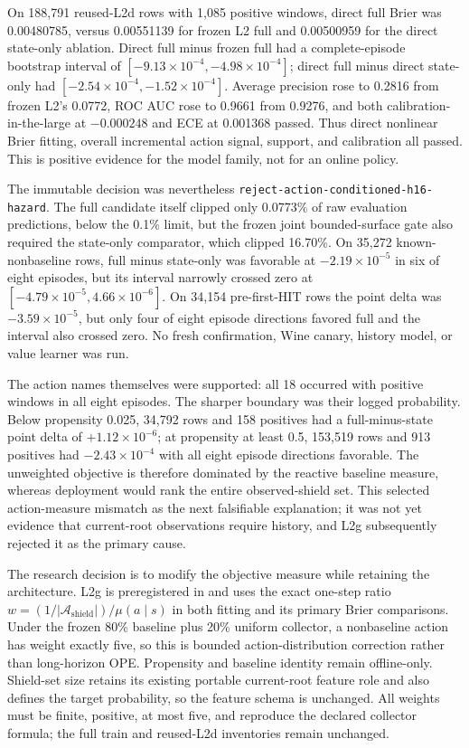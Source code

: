 \documentclass[11pt]{article}
\begin{document}
On 188,791 reused-L2d rows with 1,085 positive windows, direct full Brier was
0.00480785, versus 0.00551139 for frozen L2 full and 0.00500959 for the direct
state-only ablation.  Direct full minus frozen full had a complete-episode
bootstrap interval of
$[-9.13\times10^{-4},-4.98\times10^{-4}]$; direct full minus direct state-only
had $[-2.54\times10^{-4},-1.52\times10^{-4}]$.  Average precision rose to
0.2816 from frozen L2's 0.0772, ROC AUC rose to 0.9661 from 0.9276, and both
calibration-in-the-large at $-0.000248$ and ECE at 0.001368 passed.  Thus direct
nonlinear Brier fitting, overall incremental action signal, support, and
calibration all passed.  This is positive evidence for the model family, not
for an online policy.

The immutable decision was nevertheless
\texttt{reject-action-conditioned-h16-hazard}.  The full candidate itself
clipped only 0.0773\% of raw evaluation predictions, below the 0.1\% limit, but
the frozen joint bounded-surface gate also required the state-only comparator,
which clipped 16.70\%.  On 35,272 known-nonbaseline rows, full minus state-only
was favorable at $-2.19\times10^{-5}$ in six of eight episodes, but its
interval narrowly crossed zero at
$[-4.79\times10^{-5},4.66\times10^{-6}]$.  On 34,154 pre-first-HIT rows the
point delta was $-3.59\times10^{-5}$, but only four of eight episode directions
favored full and the interval also crossed zero.  No fresh confirmation, Wine
canary, history model, or value learner was run.

The action names themselves were supported: all 18 occurred with positive
windows in all eight episodes.  The sharper boundary was their logged
probability.  Below propensity 0.025, 34,792 rows and 158 positives had a
full-minus-state point delta of $+1.12\times10^{-6}$; at propensity at least
0.5, 153,519 rows and 913 positives had $-2.43\times10^{-4}$ with all eight
episode directions favorable.  The unweighted objective is therefore dominated
by the reactive baseline measure, whereas deployment would rank the entire
observed-shield set.  This selected action-measure mismatch as the next
falsifiable explanation; it was not yet evidence that current-root observations
require history, and L2g subsequently rejected it as the primary cause.

The research decision is to modify the objective measure while retaining the
architecture.  L2g is preregistered in
 and uses the exact
one-step ratio
$w=(1/|\mathcal A_{\mathrm{shield}}|)/\mu(a\mid s)$ in both fitting and its
primary Brier comparisons.  Under the frozen 80\% baseline plus 20\% uniform
collector, a nonbaseline action has weight exactly five, so this is bounded
action-distribution correction rather than long-horizon OPE.  Propensity and
baseline identity remain offline-only.  Shield-set size retains its existing
portable current-root feature role and also defines the target probability, so
the feature schema is unchanged.  All weights must be
finite, positive, at most five, and reproduce the declared collector formula;
the full train and reused-L2d inventories remain unchanged.
\end{document}
